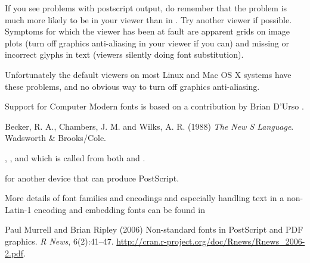 %
\begin{Note}\relax
If you see problems with postscript output, do remember that the
problem is much more likely to be in your viewer than in \R{}.  Try
another viewer if possible.  Symptoms for which the viewer has been at
fault are apparent grids on image plots (turn off graphics
anti-aliasing in your viewer if you can) and missing or incorrect glyphs
in text (viewers silently doing font substitution).

Unfortunately the default viewers on most Linux and Mac OS X systems
have these problems, and no obvious way to turn off graphics anti-aliasing.
\end{Note}
%
\begin{Author}\relax
Support for Computer Modern fonts is based on a contribution by
Brian D'Urso .
\end{Author}
%
\begin{References}\relax
Becker, R. A., Chambers, J. M. and Wilks, A. R. (1988)
\emph{The New S Language}.
Wadsworth \& Brooks/Cole.
\end{References}
%
\begin{SeeAlso}\relax
{},
,
and  which is called from both
 and .

 for another device that can produce PostScript.

More details of font families and encodings and especially handling
text in a non-Latin-1 encoding and embedding fonts can be found in

Paul Murrell and Brian Ripley (2006) Non-standard fonts in PostScript
and PDF graphics. \emph{R News}, 6(2):41--47.
\url{http://cran.r-project.org/doc/Rnews/Rnews_2006-2.pdf}.
\end{SeeAlso}
%
